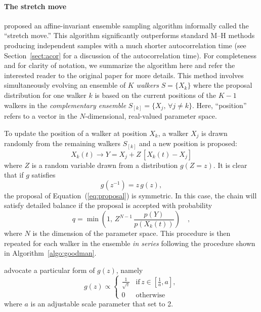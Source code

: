 \documentclass[12pt,preprint]{aastex}
\newcommand{\Eq}[1]{Equation~(\ref{eq:#1})}
\newcommand{\eq}[1]{\Eq{#1}}
\newcommand{\eqlabel}[1]{\label{eq:#1}}
\newcommand{\Sect}[1]{Section~\ref{sect:#1}}
\newcommand{\sect}[1]{\Sect{#1}}
\newcommand{\Algo}[1]{Algorithm~\ref{algo:#1}}
\newcommand{\algo}[1]{\Algo{#1}}
\newcommand{\ensemble}{S}
\renewcommand{\vector}[1]{#1}
\newcommand{\pr}[1]{\ensuremath{p(#1)}}
\begin{document}
\paragraph{The stretch move}

 proposed an affine-invariant ensemble sampling
algorithm informally called the ``stretch move.'' This algorithm
significantly outperforms standard M--H methods producing independent
samples with a much shorter autocorrelation time (see \sect{acor} for
a discussion of the autocorrelation time). For completeness and for
clarity of notation, we summarize the algorithm here and refer the interested
reader to the original paper for more details. This method involves
simultaneously evolving an ensemble of $K$ \emph{walkers}
$\ensemble = \{ \vector{X_k} \}$ where the proposal
distribution for one walker $k$ is based on the current positions of the
$K-1$ walkers in the \emph{complementary ensemble}
$\ensemble_{[k]} = \{ \vector{X_j}, \, \forall j \ne k \}$. Here, ``position''
refers to a vector in the $N$-dimensional, real-valued parameter space.


To update the position of a walker at position $\vector{X_k}$,
a walker $X_j$ is drawn randomly from the remaining walkers $\ensemble_{[k]}$
and a new position is proposed:
\begin{equation}
    \eqlabel{proposal}
    \vector{X_k} (t) \to \vector{Y} = \vector{X_j}
            + Z \, [\vector{X_k} (t) - \vector{X_j}]
\end{equation}
where $Z$ is a random variable drawn from a distribution $g(Z = z)$.
It is clear that if $g$ satisfies
\begin{equation}
    g(z^{-1}) = z \, g(z),
\end{equation}
the proposal of \eq{proposal} is symmetric. In this case, the chain will
satisfy detailed balance if the proposal is accepted with probability
\begin{equation}
    \eqlabel{acceptance}
    q = \min \left( 1,\, Z^{N-1} \,
                \frac{\pr{\vector{Y}}}{\pr{\vector{X_k} (t)}} \right) \quad,
\end{equation}
where $N$ is the dimension of the parameter space. This procedure is then
repeated for each walker in the ensemble \emph{in series} following the
procedure shown in \algo{goodman}.

 advocate a particular form of $g(z)$, namely
\begin{equation}
    \eqlabel{goodmanprop}
    g(z) \propto \left \{ \begin{array}{ll}
        \displaystyle\frac{1}{\sqrt{z}} & \mathrm{if}\, z\in
                        \left [ \displaystyle\frac{1}{a}, a \right ], \\
        0 & \mathrm{otherwise}
    \end{array} \right .
\end{equation}
where $a$ is an adjustable scale parameter that  set
to 2.
\end{document}
